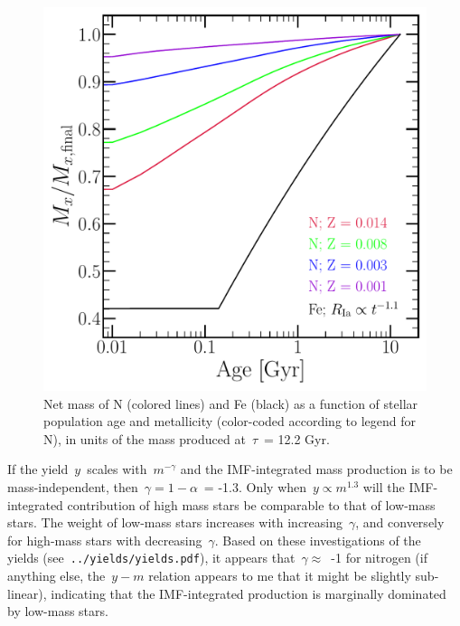 \documentclass[12pt]{report}
\begin{document}
\begin{figure}[t] 
\centering 
\includegraphics[scale = 0.5]{n_vs_fe_ssp.pdf} 
\caption{Net mass of N (colored lines) and Fe (black) as a function of stellar 
population age and metallicity (color-coded according to legend for N), in 
units of the mass produced at~$\tau$~= 12.2 Gyr. } 
\label{fig:n_vs_fe_ssp} 
\end{figure} 

If the yield~$y$~scales with~$m^{-\gamma}$ and the IMF-integrated mass 
production is to be mass-independent, then~$\gamma = 1 - \alpha$~= -1.3. Only 
when~$y \propto m^{1.3}$ will the IMF-integrated contribution of high mass 
stars be comparable to that of low-mass stars. The weight of low-mass stars 
increases with increasing~$\gamma$, and conversely for high-mass stars with 
decreasing~$\gamma$. Based on these investigations of the~\citet{Cristallo2011} 
yields (see~\texttt{../yields/yields.pdf}), it appears that~$\gamma \approx$~-1 
for nitrogen (if anything else, the~$y-m$ relation appears to me that it might 
be slightly sub-linear), indicating that the IMF-integrated production is 
marginally dominated by low-mass stars. 
\end{document}
